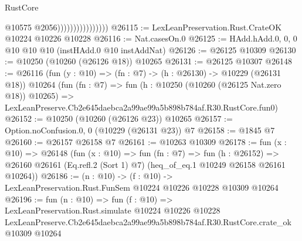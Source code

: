 \begin{lexlean}{RustCore}
\begin{coremodule}
                                    @10575
                                    @2056))))))))))))))))
@26115 := LexLeanPreservation.Rust.CrateOK @10224 @10226 @10228
@26116 := Nat.casesOn.{0}
@26125 := HAdd.hAdd.{0, 0, 0} @10 @10 @10 (instHAdd.{0} @10 instAddNat)
@26126 := @26125 @10309
@26130 := @10250 (@10260 (@26126 @18)) @10265
@26131 := @26125 @10307
@26148 := @26116
    (fun (y : @10) => (fn : @7) -> (h : @26130) -> @10229 (@26131 @18))
    @10264
    (fun (fn : @7) =>
    fun (h : @10250 (@10260 (@26125 Nat.zero @18)) @10265) =>
    LexLeanPreserve.Cb2e645daebca2a99ae99a5b898b784af.R30.RustCore.fun0)
@26152 := @10250 (@10260 (@26126 @23)) @10265
@26157 := Option.noConfusion.{0, 0} (@10229 (@26131 @23)) @7
@26158 := @1845 @7
@26160 := @26157 @26158 @7
@26161 := @10263 @10309
@26178 := fun (x : @10) =>
  @26148
    (fun (x : @10) =>
    fun (fn : @7) =>
    fun (h : @26152) =>
    @26160 @26161 (Eq.refl.{2} (Sort 1) @7) (heq_of_eq.{1} @10249 @26158 @26161 @10264))
@26186 := (n : @10) ->
  (f : @10) -> LexLeanPreservation.Rust.FunSem @10224 @10226 @10228 @10309 @10264
@26196 := fun (n : @10) =>
  fun (f : @10) =>
  LexLeanPreservation.Rust.simulate
    @10224
    @10226
    @10228
    LexLeanPreserve.Cb2e645daebca2a99ae99a5b898b784af.R30.RustCore.crate_ok
    @10309
    @10264
\end{coremodule}
\end{lexlean}
